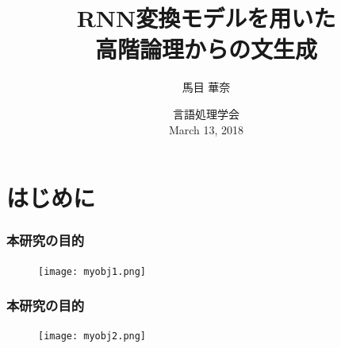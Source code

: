 \documentclass[dvipdfmx]{beamer}
\title{RNN変換モデルを用いた\\高階論理からの文生成}
\author[]{馬目 華奈}
\institute{お茶の水女子大学 戸次研究室}
\date{
言語処理学会\\
March 13, 2018}
\begin{document}
\begin{frame}
  \titlepage
\end{frame}



\section{はじめに}
\begin{frame}
\frametitle{本研究の目的}
\begin{center}
\begin{figure}[h]
	\texttt{[image: myobj1.png]}
        \label{fig:myobj1}
\end{figure}
\end{center}
\end{frame}

\begin{frame}
\frametitle{本研究の目的}
\begin{center}
\begin{figure}[h]
	\texttt{[image: myobj2.png]}
        \label{fig:myobj2}
\end{figure}
\end{center}
\end{frame}
\end{document}

